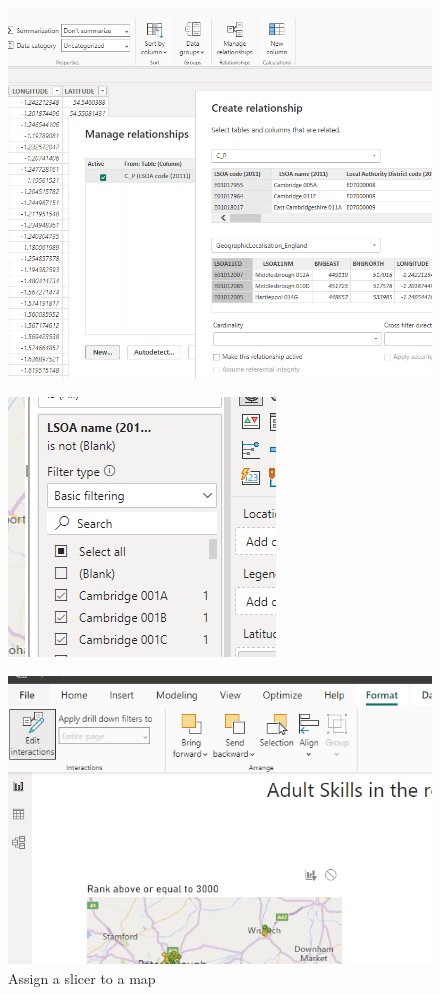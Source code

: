 \documentclass[11pt]{article}
\begin{document}
\begin{figure}[h!]
    \centering
    \begin{minipage}{.5\textwidth}
      \centering
    \includegraphics[width=.7\linewidth]{img/relation.png}
      \label{fig:relation}
    \end{minipage}%
    \begin{minipage}{.5\textwidth}
      \centering
      \includegraphics[width=.6\linewidth]{img/filter.png}
      \label{fig:filter}
    \end{minipage}
\end{figure}

\begin{figure}[h!]
    \centering
    \includegraphics[width=.4\linewidth]{img/interaction.PNG}
    \caption{Assign a slicer to a map}
    \label{fig:interaction}
\end{figure}
\end{document}
